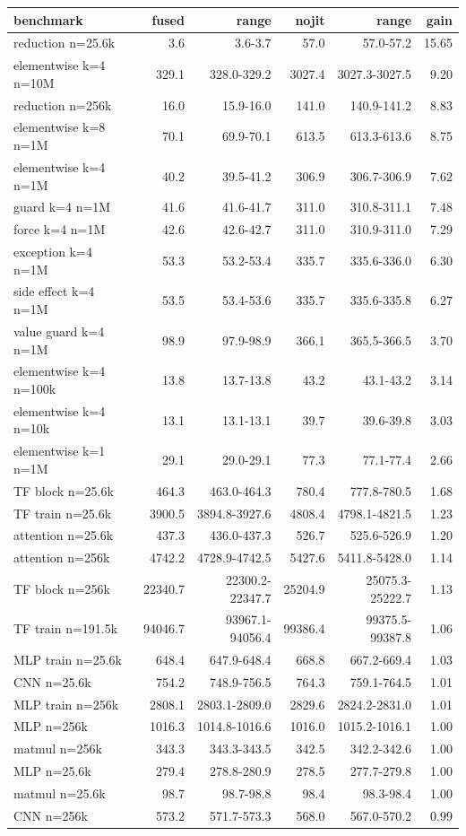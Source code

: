 \begin{tabular}{lrrrrr}
\toprule
benchmark & fused & range & nojit & range & gain \\
\midrule
reduction n=25.6k & 3.6 & 3.6-3.7 & 57.0 & 57.0-57.2 & 15.65 \\
elementwise k=4 n=10M & 329.1 & 328.0-329.2 & 3027.4 & 3027.3-3027.5 & 9.20 \\
reduction n=256k & 16.0 & 15.9-16.0 & 141.0 & 140.9-141.2 & 8.83 \\
elementwise k=8 n=1M & 70.1 & 69.9-70.1 & 613.5 & 613.3-613.6 & 8.75 \\
elementwise k=4 n=1M & 40.2 & 39.5-41.2 & 306.9 & 306.7-306.9 & 7.62 \\
guard k=4 n=1M & 41.6 & 41.6-41.7 & 311.0 & 310.8-311.1 & 7.48 \\
force k=4 n=1M & 42.6 & 42.6-42.7 & 311.0 & 310.9-311.0 & 7.29 \\
exception k=4 n=1M & 53.3 & 53.2-53.4 & 335.7 & 335.6-336.0 & 6.30 \\
side effect k=4 n=1M & 53.5 & 53.4-53.6 & 335.7 & 335.6-335.8 & 6.27 \\
value guard k=4 n=1M & 98.9 & 97.9-98.9 & 366.1 & 365.5-366.5 & 3.70 \\
elementwise k=4 n=100k & 13.8 & 13.7-13.8 & 43.2 & 43.1-43.2 & 3.14 \\
elementwise k=4 n=10k & 13.1 & 13.1-13.1 & 39.7 & 39.6-39.8 & 3.03 \\
elementwise k=1 n=1M & 29.1 & 29.0-29.1 & 77.3 & 77.1-77.4 & 2.66 \\
TF block n=25.6k & 464.3 & 463.0-464.3 & 780.4 & 777.8-780.5 & 1.68 \\
TF train n=25.6k & 3900.5 & 3894.8-3927.6 & 4808.4 & 4798.1-4821.5 & 1.23 \\
attention n=25.6k & 437.3 & 436.0-437.3 & 526.7 & 525.6-526.9 & 1.20 \\
attention n=256k & 4742.2 & 4728.9-4742.5 & 5427.6 & 5411.8-5428.0 & 1.14 \\
TF block n=256k & 22340.7 & 22300.2-22347.7 & 25204.9 & 25075.3-25222.7 & 1.13 \\
TF train n=191.5k & 94046.7 & 93967.1-94056.4 & 99386.4 & 99375.5-99387.8 & 1.06 \\
MLP train n=25.6k & 648.4 & 647.9-648.4 & 668.8 & 667.2-669.4 & 1.03 \\
CNN n=25.6k & 754.2 & 748.9-756.5 & 764.3 & 759.1-764.5 & 1.01 \\
MLP train n=256k & 2808.1 & 2803.1-2809.0 & 2829.6 & 2824.2-2831.0 & 1.01 \\
MLP n=256k & 1016.3 & 1014.8-1016.6 & 1016.0 & 1015.2-1016.1 & 1.00 \\
matmul n=256k & 343.3 & 343.3-343.5 & 342.5 & 342.2-342.6 & 1.00 \\
MLP n=25.6k & 279.4 & 278.8-280.9 & 278.5 & 277.7-279.8 & 1.00 \\
matmul n=25.6k & 98.7 & 98.7-98.8 & 98.4 & 98.3-98.4 & 1.00 \\
CNN n=256k & 573.2 & 571.7-573.3 & 568.0 & 567.0-570.2 & 0.99 \\
\bottomrule
\end{tabular}
